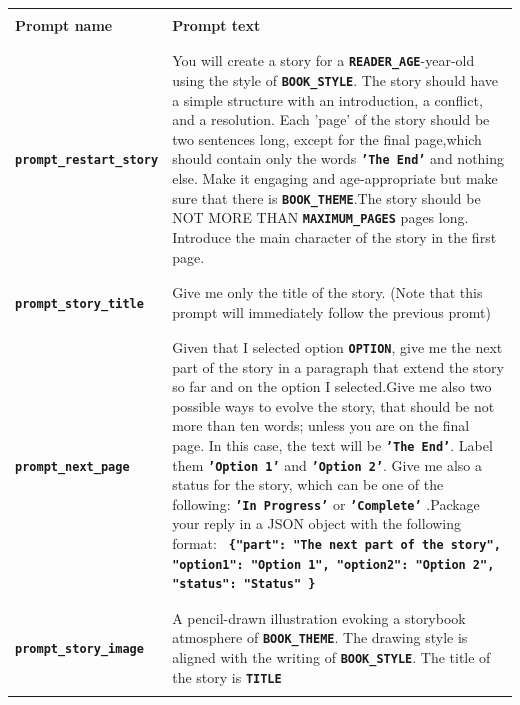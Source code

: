 \documentclass[conference]{IEEEtran}
\begin{document}
	\begin{table}[H]
	\centering
	\begin{tabular}{|l|p{8cm}|}
		\hline
		& \\
		\textbf{Prompt name} & \textbf{Prompt text} \\
		& \\ \hline
				
		& \\
		\textbf{\texttt{prompt\_restart\_story}} & You will create a story for a \textbf{\texttt{READER\_AGE}}-year-old using the style of \textbf{\texttt{BOOK\_STYLE}}. The story should have a simple structure with an introduction, a conflict, and a resolution. Each 'page' of the story should be two sentences long, except for the final page,which should contain only the words \textbf{\texttt{'The End'}} and nothing else. Make it engaging and age-appropriate but make sure that there is \textbf{\texttt{BOOK\_THEME}}.The story should be NOT MORE THAN \textbf{\texttt{MAXIMUM\_PAGES}} pages long. Introduce the main character of the story in the first page. \\ 
		& \\ \hline
		
		& \\
		\textbf{\texttt{prompt\_story\_title}} & Give me only the title of the story.  (Note that this prompt will immediately follow the previous promt)\\
		& \\ \hline
		
		& \\
		\textbf{\texttt{prompt\_next\_page}} & Given that I selected option \textbf{\texttt{OPTION}}, give me the next part of the story in a paragraph that extend the story so far and on the option I selected.Give me also two possible ways to evolve the story, that should be not more than ten words; unless you are on the final page. In this case, the text will be \textbf{\texttt{'The End'}}. Label them \textbf{\texttt{'Option 1'}} and \textbf{\texttt{'Option 2'}}. Give me also a status for the story, which can be one of the following: \textbf{\texttt{'In Progress'}} or \textbf{\texttt{'Complete'}} .Package your reply in a JSON object with the following format: \textbf{\texttt{ \{"part": "The next part of the story", "option1": "Option 1", "option2": "Option 2", "status": "Status" \} }} \\
		& \\ \hline
				
		& \\
		\textbf{\texttt{prompt\_story\_image}} & A pencil-drawn illustration evoking a storybook atmosphere of \textbf{\texttt{BOOK\_THEME}}. The drawing style is aligned with the writing of \textbf{\texttt{BOOK\_STYLE}}. The title of the story is \textbf{\texttt{TITLE}} \\
		& \\ \hline
		
	\end{tabular}
\end{table}

	
\end{document}

